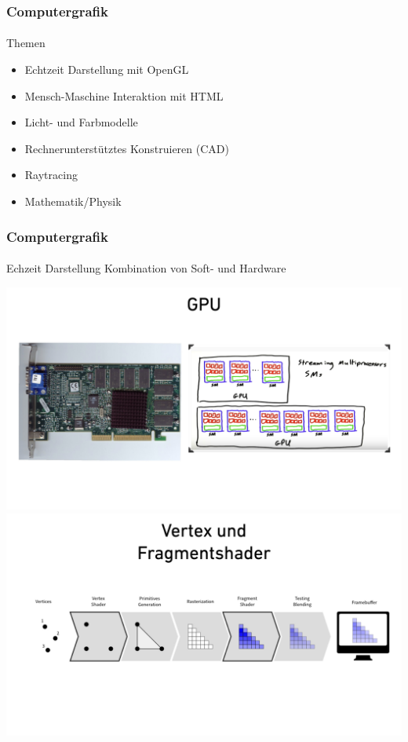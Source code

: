 \documentclass{beamer}
\begin{document}
\begin{frame}
    \frametitle{Computergrafik}
\framesubtitle{}
    \begin{block}{Themen}
\begin{itemize}
\item Echtzeit Darstellung mit OpenGL
\item Mensch-Maschine Interaktion mit HTML
\item Licht- und Farbmodelle
\item Rechnerunterstütztes Konstruieren (CAD)
\item Raytracing
\item Mathematik/Physik
\end{itemize}
\end{block}

\end{frame}






\begin{frame}
    \frametitle{Computergrafik}
\framesubtitle{}
    \begin{block}{Echzeit Darstellung}
Kombination von Soft- und Hardware
\end{block}
\includegraphics[scale=0.1]{images/Shaderday_Intro/Shaderday_Intro_004} \\
\includegraphics[scale=0.1]{images/Shaderday_Intro/Shaderday_Intro_007}

\end{frame}
\end{document}
